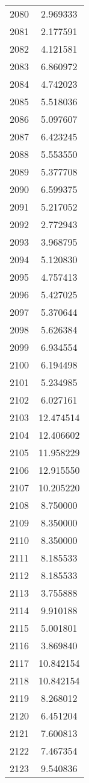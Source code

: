 \documentclass[12pt]{article}
\begin{document}
\begin{longtable}{@{}cc@{}}
2080 & 2.969333 \\
2081 & 2.177591 \\
2082 & 4.121581 \\
2083 & 6.860972 \\
2084 & 4.742023 \\
2085 & 5.518036 \\
2086 & 5.097607 \\
2087 & 6.423245 \\
2088 & 5.553550 \\
2089 & 5.377708 \\
2090 & 6.599375 \\
2091 & 5.217052 \\
2092 & 2.772943 \\
2093 & 3.968795 \\
2094 & 5.120830 \\
2095 & 4.757413 \\
2096 & 5.427025 \\
2097 & 5.370644 \\
2098 & 5.626384 \\
2099 & 6.934554 \\
2100 & 6.194498 \\
2101 & 5.234985 \\
2102 & 6.027161 \\
2103 & 12.474514 \\
2104 & 12.406602 \\
2105 & 11.958229 \\
2106 & 12.915550 \\
2107 & 10.205220 \\
2108 & 8.750000 \\
2109 & 8.350000 \\
2110 & 8.350000 \\
2111 & 8.185533 \\
2112 & 8.185533 \\
2113 & 3.755888 \\
2114 & 9.910188 \\
2115 & 5.001801 \\
2116 & 3.869840 \\
2117 & 10.842154 \\
2118 & 10.842154 \\
2119 & 8.268012 \\
2120 & 6.451204 \\
2121 & 7.600813 \\
2122 & 7.467354 \\
2123 & 9.540836 \\

\end{longtable}
\end{document}
